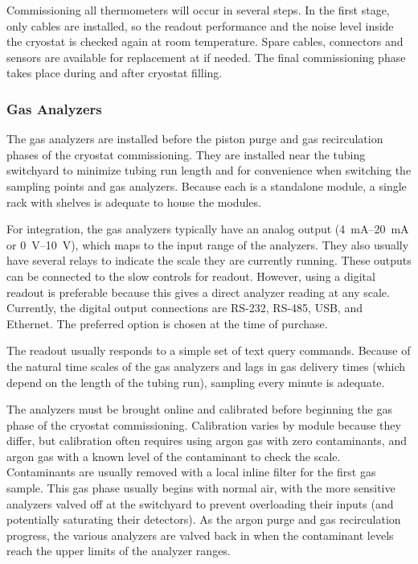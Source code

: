 Commissioning all thermometers will occur in several steps. In the first stage, only cables %
are installed, so
the readout performance and the noise level inside the cryostat %
is checked again at room temperature.
Spare cables, connectors and sensors are available for replacement at  if needed. 
The final commissioning phase %
takes place during and after cryostat filling.  


\subsubsection{Gas Analyzers}
\label{sec:fdgen-slow-cryo-install-ga}

The gas analyzers %
are installed before the piston purge and gas recirculation phases of the cryostat commissioning. They %
are installed near the tubing switchyard to minimize tubing run length and for convenience when switching the sampling points and gas analyzers. Because each is a standalone module, a single rack with shelves %
is adequate to house the modules.

For integration, the gas analyzers typically have an analog output (\SIrange{4}{20}{mA} or \SIrange{0}{10}{V}), which maps to the input range of the analyzers. They also usually have several relays to indicate the scale they are currently running. These outputs can be connected to the slow controls for readout. However, using a digital readout is preferable because this gives a direct analyzer reading at any scale. Currently, the digital output connections are RS-232, RS-485, USB, and Ethernet. The preferred option is chosen at the time of purchase. %

The readout usually responds to a simple set of text query commands. Because of the natural time scales of the gas analyzers and lags in gas delivery times (which depend on the length of the tubing run), sampling every minute is adequate.

The analyzers %
must be brought online and calibrated before beginning the gas phase of the cryostat commissioning.  Calibration varies by module because they differ, but calibration often requires using argon gas with zero contaminants, and argon gas with a known level of the contaminant to check the scale. Contaminants are usually removed with a local inline filter for the first gas sample. %
This gas phase usually begins with normal air, with the more sensitive analyzers valved off at the switchyard to prevent overloading their inputs (and potentially saturating their detectors). As the argon purge and gas recirculation progress, the various analyzers %
are valved back in when the contaminant levels reach the upper limits of the analyzer ranges. 

